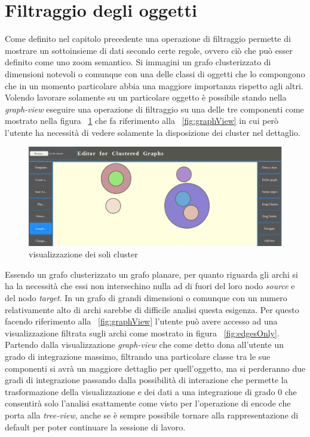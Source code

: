 {\section{Filtraggio degli oggetti}
Come definito nel capitolo precedente una operazione di filtraggio permette di mostrare un sottoinsieme di dati secondo certe regole, ovvero ciò che può esser definito come uno zoom semantico. Si immagini un grafo clusterizzato di dimensioni notevoli o comunque con una delle classi di oggetti che lo compongono che in un momento particolare abbia una maggiore importanza rispetto agli altri. Volendo lavorare solamente su un particolare oggetto è possibile stando nella \textit{graph-view} eseguire una operazione di filtraggio su una delle tre componenti come mostrato nella figura \figurename~\ref{fig:clustersOnly} che fa riferimento  alla \figurename~\ref{fig:graphView} in cui però l'utente ha necessità di vedere solamente la disposizione dei cluster nel dettaglio.
\begin{figure}[!htb]
	\begin{center}
		\includegraphics[width=1 \linewidth]{figure/clustersOnly}
	\end{center}
	\caption{visualizzazione dei soli cluster\label{fig:clustersOnly}}
\end{figure}
Essendo un grafo clusterizzato un grafo planare, per quanto riguarda gli archi si ha la necessità che essi non intersechino nulla ad di fuori del loro nodo \textit{source} e del nodo \textit{target}. In un grafo di grandi dimensioni o comunque con un numero relativamente alto di archi sarebbe di difficile analisi questa esigenza. Per questo facendo riferimento alla \figurename~\ref{fig:graphView} l'utente può avere accesso ad una visualizzazione filtrata sugli archi come mostrato in figura \figurename~\ref{fig:edgesOnly}. Partendo dalla visualizzazione \textit{graph-view} che come detto dona all'utente un grado di integrazione massimo, filtrando una particolare classe tra le sue componenti si avrà un maggiore dettaglio per quell'oggetto, ma si perderanno due gradi di integrazione passando dalla possibilità di interazione che permette la trasformazione della visualizzazione e dei dati a una integrazione di grado $0$ che consentirà solo l'analisi esattamente come visto per l'operazione di encode che porta alla \textit{tree-view}, anche se è sempre possibile tornare alla rappresentazione di default per poter continuare la sessione di lavoro.  
}
